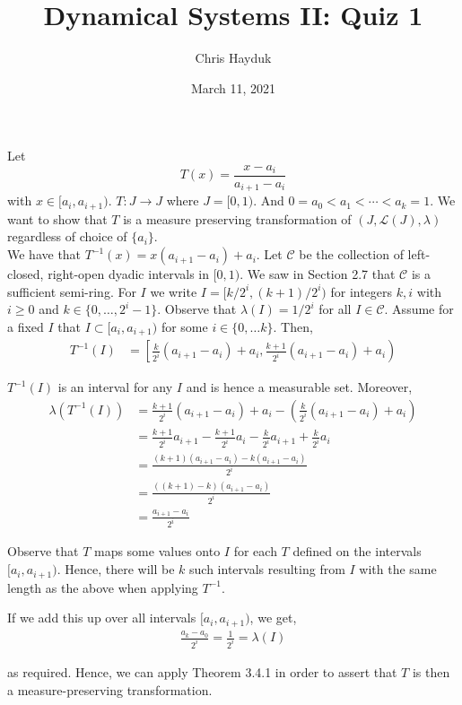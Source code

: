 \documentclass[12pt]{article}
\newenvironment{problem}[2][Problem]{\begin{trivlist}
\item[\hskip \labelsep {\bfseries #1}\hskip \labelsep {\bfseries #2.}]}{\end{trivlist}}
\begin{document}
\title{Dynamical Systems II: Quiz 1}

\author{Chris Hayduk}
\date{March 11, 2021}

\maketitle

\begin{problem}{1}
\end{problem}

Let $$T(x) = \frac{x-a_i}{a_{i+1} - a_i}$$ with $x \in [a_i, a_{i+1})$. $T: J \to J$ where $J = [0, 1)$. And $0 = a_0 < a_1 < \cdots < a_k = 1$. We want to show that $T$ is a measure preserving transformation of $(J, \mathcal{L}(J), \lambda)$ regardless of choice of $\{a_i\}$.\\

We have that $T^{-1}(x) = x(a_{i+1} - a_i) + a_i$. Let $\mathcal{C}$ be the collection of left-closed, right-open dyadic intervals in $[0, 1)$. We saw in Section 2.7 that $\mathcal{C}$ is a sufficient semi-ring. For $I$ we write $I=[k/2^i, (k+1)/2^i)$ for integers $k, i$ with $i \geq 0$ and $k \in \{0, \ldots, 2^i -1\}$. Observe that $\lambda(I) = 1/2^i$ for all $I \in \mathcal{C}$. Assume for a fixed $I$ that $I \subset [a_i, a_{i+1})$ for some $i \in \{0, \ldots k\}$. Then,
\begin{align*}
T^{-1}(I) &= \left[\frac{k}{2^i}(a_{i+1} - a_i) + a_i, \frac{k+1}{2^i}(a_{i+1} - a_i) + a_i \right)
\end{align*}

$T^{-1}(I)$ is an interval for any $I$ and is hence a measurable set. Moreover,
\begin{align*}
\lambda(T^{-1}(I)) &= \frac{k+1}{2^i}(a_{i+1} - a_i) + a_i - (\frac{k}{2^i}(a_{i+1} - a_i) + a_i)\\
&= \frac{k+1}{2^i}a_{i+1} - \frac{k+1}{2^i}a_i - \frac{k}{2^i}a_{i+1} + \frac{k}{2^i}a_i\\
&= \frac{(k+1)(a_{i+1} - a_i) - k(a_{i+1} - a_i)}{2^i}\\
&= \frac{((k+1)-k)(a_{i+1} - a_i)}{2^i}\\
&= \frac{a_{i+1} - a_i}{2^i}
\end{align*}

Observe that $T$ maps some values onto $I$ for each $T$ defined on the intervals $[a_i, a_{i+1})$. Hence, there will be $k$ such intervals resulting from $I$ with the same length as the above when applying $T^{-1}$.

If we add this up over all intervals $[a_i, a_{i+1})$, we get,
\begin{align*}
\frac{a_k - a_0}{2^i} = \frac{1}{2^i} = \lambda(I)
\end{align*}

as required. Hence, we can apply Theorem 3.4.1 in order to assert that $T$ is then a measure-preserving transformation.
\end{document}
